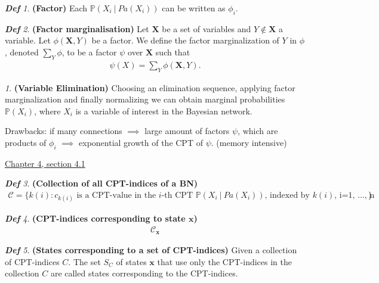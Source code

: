 \documentclass{amsart}
\theoremstyle{plain}
\theoremstyle{remark}
\newtheorem*{remark*}{}
\newtheorem*{definition*}{\textbf{\em Def}}
\theoremstyle{plain}
\renewcommand{\P}{{\mathbb P}}
\newcommand{\C}{{\mathcal C}}
\newcommand{\bfx}{{\mathbf{x}}}
\newcommand{\bfX}{{\mathbf{X}}}
\newcommand{\vs}{\vspace{0.75pc}}
\begin{document}
\begin{definition*}\textbf{ (Factor) }
Each $ \P(X_i\ |\ Pa(X_i))$ can be written as $\phi_i$.
\end{definition*}\vs

\begin{definition*}\textbf{ (Factor marginalisation) }
Let $\bfX$ be a set of variables and $Y \notin \bfX$ a variable. Let $\phi(\bfX,Y)$ be a factor. We define the factor marginalization of $Y$ in $\phi$, denoted $\sum_Y \phi$, to be a factor $\psi$ over $\bfX$ such that
\begin{align*}
\psi(X) = \sum_Y \phi(\bfX,Y).
\end{align*}
\end{definition*}\vs

\begin{remark*}\textbf{(Variable Elimination)}
Choosing an elimination sequence, applying factor marginalization and finally normalizing we can obtain marginal probabilities $\P(X_i)$, where $X_i$ is a variable of interest in the Bayesian network.\vs

Drawbacks: if many connections $\implies$ large amount of factors $\psi$, which are products of $\phi_i$ $\implies$ exponential growth of the CPT of $\psi$. (memory intensive)
\end{remark*}\vs

\underline{Chapter 4, section 4.1} \\
\begin{definition*}\textbf{ (Collection of all CPT-indices of a BN) }
\begin{align*}
\C = \{ k(i): c_{k(i)} \text{ is a CPT-value in the $i$-th CPT $\P(X_i\ |\ Pa(X_i))$, indexed by $k(i)$, i=1, \ldots , n } \}
\end{align*}\vs
\end{definition*}\vs

\begin{definition*}\textbf{ (CPT-indices corresponding to state $\mathbf{x}$) }\begin{align*}
\C_\bfx
\end{align*}\vs
\end{definition*}\vs 

\begin{definition*}\textbf{ (States corresponding to a set of CPT-indices) }
Given a collection of CPT-indices $C$. The set $S_C$ of states $\bfx$ that use only the CPT-indices in the collection $C$ are called states corresponding to the CPT-indices.
\end{definition*}\vs 
\end{document}
